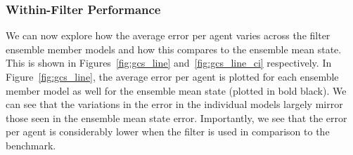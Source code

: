 \documentclass{article}
\begin{document}


\subsubsection*{Within-Filter Performance}

We can now explore how the average error per agent varies across the filter ensemble member models and how this compares to the ensemble mean state. This is shown in Figures~\ref{fig:gcs_line} and~\ref{fig:gcs_line_ci} respectively. In Figure~\ref{fig:gcs_line}, the average error per agent is plotted for each ensemble member model as well for the ensemble mean state (plotted in bold black). We can see that the variations in the error in the individual models largely mirror those seen in the ensemble mean state error. Importantly, we see that the error per agent is considerably lower when the filter is used in comparison to the benchmark.
\end{document}
